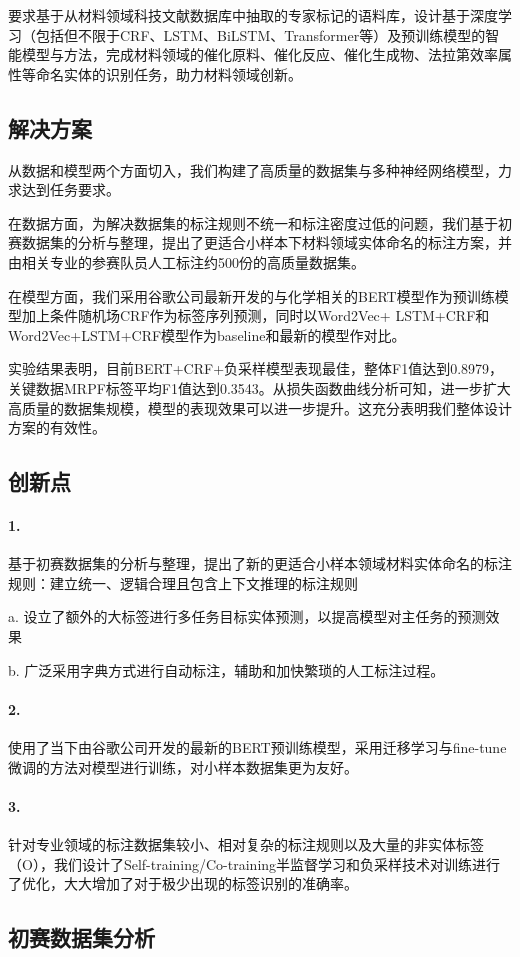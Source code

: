 \documentclass{article}
\begin{document}
	
	要求基于从材料领域科技文献数据库中抽取的专家标记的语料库，设计基于深度学习（包括但不限于CRF、LSTM、BiLSTM、Transformer等）及预训练模型的智能模型与方法，完成材料领域的催化原料、催化反应、催化生成物、法拉第效率属性等命名实体的识别任务，助力材料领域创新。
	\newpage
	\begin{center}
		\section{解决方案}
	\end{center}
	
	
	从数据和模型两个方面切入，我们构建了高质量的数据集与多种神经网络模型，力求达到任务要求。
	
	
在数据方面，为解决数据集的标注规则不统一和标注密度过低的问题，我们基于初赛数据集的分析与整理，提出了更适合小样本下材料领域实体命名的标注方案，并由相关专业的参赛队员人工标注约500份的高质量数据集。


在模型方面，我们采用谷歌公司最新开发的与化学相关的BERT模型作为预训练模型加上条件随机场CRF作为标签序列预测，同时以Word2Vec+ LSTM+CRF和Word2Vec+LSTM+CRF模型作为baseline和最新的模型作对比。


实验结果表明，目前BERT+CRF+负采样模型表现最佳，整体F1值达到0.8979，关键数据MRPF标签平均F1值达到0.3543。从损失函数曲线分析可知，进一步扩大高质量的数据集规模，模型的表现效果可以进一步提升。这充分表明我们整体设计方案的有效性。
\newpage
	\begin{center}
		\section{创新点}
	\end{center}
	\paragraph{1.} 基于初赛数据集的分析与整理，提出了新的更适合小样本领域材料实体命名的标注规则：建立统一、逻辑合理且包含上下文推理的标注规则
	
	
	a. 设立了额外的大标签进行多任务目标实体预测，以提高模型对主任务的预测效果
	
	
	b. 广泛采用字典方式进行自动标注，辅助和加快繁琐的人工标注过程。
\paragraph{2.} 使用了当下由谷歌公司开发的最新的BERT预训练模型，采用迁移学习与fine-tune微调的方法对模型进行训练，对小样本数据集更为友好。
\paragraph{3.}针对专业领域的标注数据集较小、相对复杂的标注规则以及大量的非实体标签（O），我们设计了Self-training/Co-training半监督学习和负采样技术对训练进行了优化，大大增加了对于极少出现的标签识别的准确率。
\newpage
\begin{center}
	\section{初赛数据集分析}
\end{center}
\end{document}
